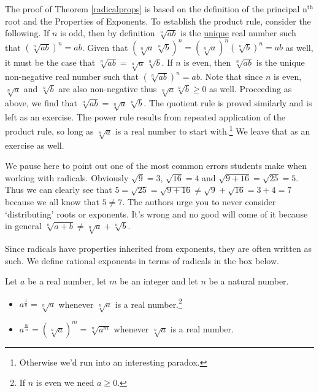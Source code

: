 \medskip

The proof of Theorem \ref{radicalprops} is based on the definition of the principal $\text{n}^{\text{th}}$ root and the Properties of Exponents.  To establish the product rule, consider the following.  If $n$ is odd, then by definition $\sqrt[n]{ab}$ is the \underline{unique} real number such that $(\sqrt[n]{ab})^{n} = ab$.  Given that $( \sqrt[n]{a} \, \sqrt[n]{b})^n = (\sqrt[n]{a})^n (\sqrt[n]{b})^n = ab$ as well, it must be the case that $\sqrt[n]{ab} = \sqrt[n]{a} \, \sqrt[n]{b}$. If $n$ is even, then $\sqrt[n]{ab}$ is the unique non-negative real number such that $(\sqrt[n]{ab})^{n} = ab$.  Note that since $n$ is even, $\sqrt[n]{a}$ and $\sqrt[n]{b}$ are also non-negative thus $\sqrt[n]{a}\sqrt[n]{b} \geq 0$ as well.  Proceeding as above, we find that $\sqrt[n]{ab} = \sqrt[n]{a} \, \sqrt[n]{b}$.  The quotient rule is proved similarly and is left as an exercise.  The power rule results from repeated application of the product rule, so long as $\sqrt[n]{a}$ is a real number to start with.\footnote{Otherwise we'd run into an interesting paradox.}   We leave that as an exercise as well.

\smallskip

We pause here to point out one of the most common errors students make when working with radicals.  Obviously $\sqrt{9} = 3$, $\sqrt{16} = 4$ and $\sqrt{9 + 16} = \sqrt{25} = 5$.  Thus we can clearly see that $5 = \sqrt{25} = \sqrt{9 + 16} \neq \sqrt{9} + \sqrt{16} = 3 + 4 = 7$ because we all know that $5 \neq 7$.  The authors urge you to never consider `distributing' roots or exponents.  It's wrong and no good will come of it because in general $\sqrt[n]{a+b} \neq \sqrt[n]{a} + \sqrt[n]{b}$. 

\label{donotdistributeexponents}

\smallskip

Since radicals have properties inherited from exponents, they are often written as such.  We define rational exponents in terms of radicals in the box below.

\medskip

\colorbox{ResultColor}{\bbm

\begin{defn}  \label{rationalexponentdefn} Let $a$ be a real number, let $m$ be an integer and let $n$ be a natural number. 

\begin{itemize}

\item  $a^{\frac{1}{n}} = \sqrt[n]{a}$ whenever $\sqrt[n]{a}$ is a real number.\footnote{If $n$ is even we need $a \geq 0$.}

\item  $a^{\frac{m}{n}}  = \left(\sqrt[n]{a}\right)^m = \sqrt[n]{a^m}$ whenever $\sqrt[n]{a}$ is a real number.

\end{itemize}
\end{defn}

\ebm}

